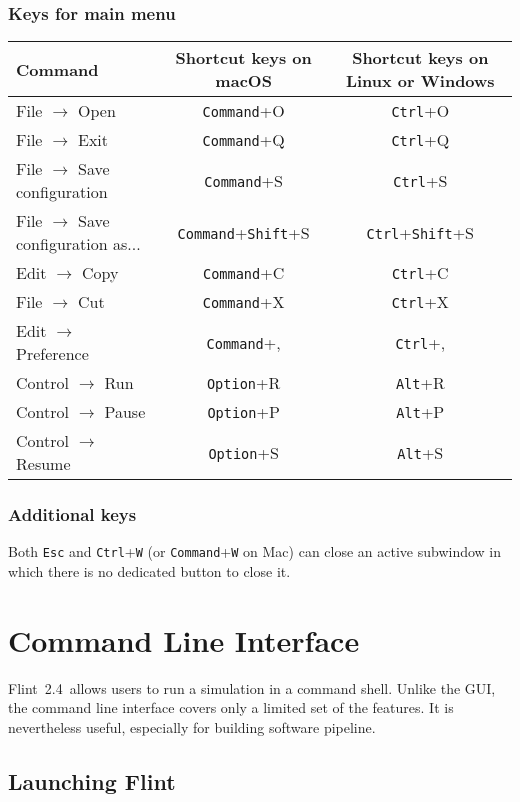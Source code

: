 \documentclass[a4paper,10pt]{report}
\def\FlintVersion{2.4}
\def\Flint{Flint~\FlintVersion}
\begin{document}
\subsection{Keys for main menu}
\begin{tabular}{l||c|c}
  Command & Shortcut keys on macOS & Shortcut keys on Linux or Windows\\
  \hline
  File $\rightarrow$ Open & {\tt Command}+O & {\tt Ctrl}+O \\
  File $\rightarrow$ Exit & {\tt Command}+Q & {\tt Ctrl}+Q \\
  File $\rightarrow$ Save configuration & {\tt Command}+S & {\tt Ctrl}+S \\
  File $\rightarrow$ Save configuration as...& {\tt Command}+{\tt Shift}+S & {\tt Ctrl}+{\tt Shift}+S \\
  Edit $\rightarrow$ Copy & {\tt Command}+C & {\tt Ctrl}+C \\
  File $\rightarrow$ Cut  & {\tt Command}+X & {\tt Ctrl}+X \\
  Edit $\rightarrow$ Preference & {\tt Command}+, & {\tt Ctrl}+, \\
  Control $\rightarrow$ Run & {\tt Option}+R & {\tt Alt}+R \\
  Control $\rightarrow$ Pause & {\tt Option}+P & {\tt Alt}+P \\
  Control $\rightarrow$ Resume & {\tt Option}+S & {\tt Alt}+S \\
\end{tabular}

\subsection{Additional keys}
Both {\tt Esc} and {\tt Ctrl}+{\tt W} (or {\tt Command}+{\tt W} on Mac) can close an active
subwindow in which there is no dedicated button to close it.


\chapter{Command Line Interface}
\Flint\ allows users to run a simulation in a command shell.
Unlike the GUI, the command line interface covers only a limited set of
the features. It is nevertheless useful, especially for building software pipeline.

\section{Launching Flint}
\end{document}
